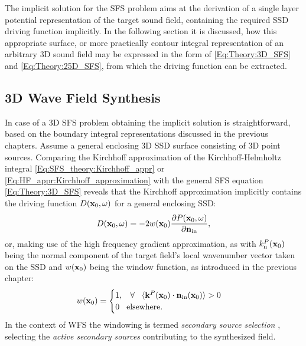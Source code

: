 The implicit solution for the SFS problem aims at the derivation of a single layer potential representation of the target sound field, containing the required SSD driving function implicitly.
In the following section it is discussed, how this appropriate surface, or more practically contour integral representation of an arbitrary 3D sound field may be expressed in the form of \eqref{Eq:Theory:3D_SFS} and \eqref{Eq:Theory:25D_SFS}, from which the driving function can be extracted.

\subsection{3D Wave Field Synthesis}

In case of a 3D SFS problem obtaining the implicit solution is straightforward, based on the boundary integral representations discussed in the previous chapters.
Assume a general enclosing 3D SSD surface consisting of 3D point sources.
Comparing the Kirchhoff approximation of the Kirchhoff-Helmholtz integral \eqref{Eq:SFS_theory:Kirchhoff_appr} or \eqref{Eq:HF_appr:Kirchhoff_approximation} with the general SFS equation \eqref{Eq:Theory:3D_SFS} reveals that the Kirchhoff approximation implicitly contains the driving function $D(\mathbf{x}_0,\omega)$ for a general enclosing SSD: 
\begin{equation}
D(\mathbf{x}_0,\omega) = - 2w(\mathbf{x}_0)\frac{\partial P(\mathbf{x}_0,\omega)}{\partial \mathbf{n}_{\mathrm{in}}}, 
\label{Eq:Theory:2D_3D_WFS_driv_fun}
\end{equation}
or, making use of the high frequency gradient approximation, as
with $k_{\mathrm{n}}^P(\mathbf{x}_0)$ being the normal component of the target field's local wavenumber vector taken on the SSD and $w(\mathbf{x}_0)$ being the window function, as introduced in the previous chapter:
\begin{equation}
\label{Eq:Theory:SSD_selection}
w(\mathbf{x}_0) = \begin{cases}
                        1, \hspace{3mm} \forall \hspace{3mm} \langle \mathbf{k}^P(\mathbf{x}_0) \cdot \mathbf{n}_{\text{in}}(\mathbf{x}_0) \rangle > 0 \\
                        0  \hspace{3mm} \text{elsewhere}.
                    \end{cases}
\end{equation}
In the context of WFS the windowing is termed \emph{secondary source selection} \cite{nicol19993d, Spors2007:DAGA:SS_selection_criterion, Spors2007}, selecting the \emph{active secondary sources} contributing to the synthesized field.


